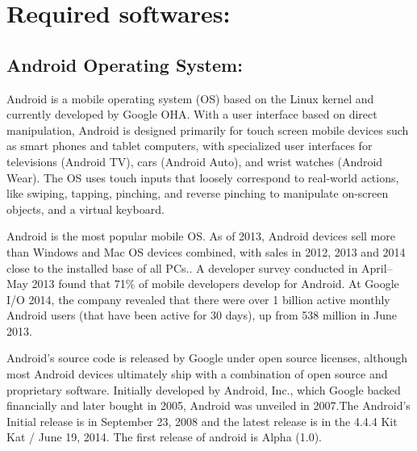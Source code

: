 \section{Required softwares: }

\subsection{Android Operating System: }
 Android is a mobile operating system (OS) based on the Linux kernel and currently developed by Google OHA. With a user interface based on direct manipulation, Android is designed primarily for touch screen mobile devices such as smart phones and tablet computers, with specialized user interfaces for televisions (Android TV), cars (Android Auto), and wrist watches (Android Wear). The OS uses touch inputs that loosely correspond to real-world actions, like swiping, tapping, pinching, and reverse pinching to 
manipulate on-screen objects, and a virtual keyboard.

Android is the most popular mobile OS. As of 2013, Android devices sell more than Windows and Mac OS devices combined, with sales in 2012, 2013 and 2014 close to the installed base of all PCs.. A developer survey conducted in April–May 2013 found that 71\% of mobile developers develop for Android. At Google I/O 2014, the company revealed that there were over 1 billion active monthly Android users (that have been active for 30 days), up from 538 million in June 2013.

Android's source code is released by Google under open source licenses, although most Android devices ultimately ship with a combination of open source and proprietary software. Initially developed by Android, Inc., which Google backed financially and later bought in 2005, Android was unveiled in 2007.The Android’s Initial release is in September 23, 2008 and the latest release is in the 4.4.4 Kit Kat / June 19, 2014. The first release of android is Alpha (1.0). 

